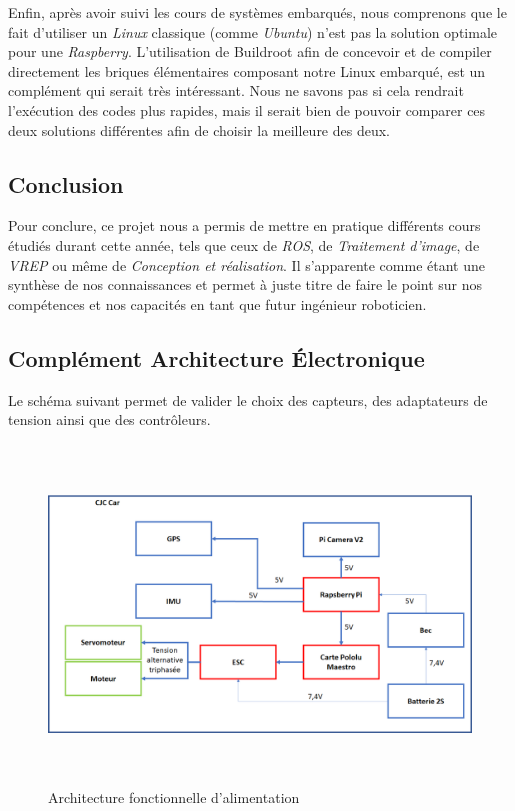 \documentclass[12pt, openany]{report}
\begin{document}
Enfin, après avoir suivi les cours de systèmes embarqués, nous comprenons que le fait d'utiliser un \textit{Linux} classique (comme \textit{Ubuntu}) n'est pas la solution optimale pour une \textit{Raspberry}. L'utilisation de Buildroot afin de concevoir et de compiler directement les briques élémentaires composant notre Linux embarqué, est un complément qui serait très intéressant. Nous ne savons pas si cela rendrait l'exécution des codes plus rapides, mais il serait bien de pouvoir comparer ces deux solutions différentes afin de choisir la meilleure des deux.\\

\section*{Conclusion}
Pour conclure, ce projet nous a permis de mettre en pratique différents cours étudiés durant cette année, tels que ceux de \textit{ROS}, de \textit{Traitement d'image}, de \textit{VREP} ou même de \textit{Conception et réalisation}. Il s'apparente comme étant une synthèse de nos connaissances et permet à juste titre de faire le point sur nos compétences et nos capacités en tant que futur ingénieur roboticien.\\
\pagebreak

\begin{appendix}
    \chapter{Complément Architecture Électronique}
    \label{carchf}
Le schéma suivant permet de valider le choix des capteurs, des adaptateurs de tension ainsi que des contrôleurs.\\
\begin{figure}[H]
     \centering
     \includegraphics[width=13cm, height = 9cm]{Archi fonct tension.png}
     \caption{Architecture fonctionnelle d'alimentation}
     \label{fig:arch_compl}
\end{figure}
\end{appendix}

\pagebreak
\listoffigures
\end{document}
